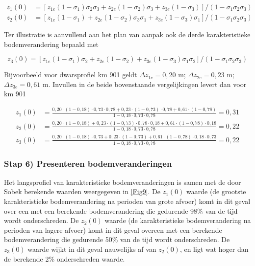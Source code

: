 \begin{align}
z_1(0) &= [z_{1e} (1-\sigma_1) \sigma_2 \sigma_3 + z_{2e} (1-\sigma_2) \sigma_3 + z_{3e} (1-\sigma_3)]/(1 - \sigma_1 \sigma_2 \sigma_3) \\
z_2(0) &= [z_{1e} (1-\sigma_1) + z_{2e} (1-\sigma_2) \sigma_3 \sigma_1 + z_{3e} (1-\sigma_3) \sigma_1]/(1 - \sigma_1 \sigma_2 \sigma_3)
\end{align}

Ter illustratie is aanvullend aan het plan van aanpak ook de derde karakteristieke bodemverandering bepaald met

\begin{equation}
z_3(0) = [z_{1e} (1-\sigma_1) \sigma_2 + z_{2e} (1-\sigma_2) + z_{3e} (1-\sigma_3) \sigma_1 \sigma_2]/(1 - \sigma_1 \sigma_2 \sigma_3)
\end{equation}

Bijvoorbeeld voor dwarsprofiel km 901 geldt $\Delta z_{1e}=0,20$ m; $\Delta z_{2e}=0,23$ m; $\Delta z_{3e}=0,61$ m.
Invullen in de beide bovenstaande vergelijkingen levert dan voor km 901

\begin{align}
z_1(0) &= \tfrac{0,20 \cdot (1-0,18) \cdot 0,73 \cdot 0,78 + 0,23 \cdot (1-0,73) \cdot 0,78 + 0,61 \cdot (1-0,78)}{1 - 0,18 \cdot 0,73 \cdot 0,78} = 0,31 \\
z_2(0) &= \tfrac{0,20 \cdot (1-0,18) + 0,23 \cdot (1-0,73) \cdot 0,78 \cdot 0,18 + 0,61 \cdot (1-0,78) \cdot 0,18}{1 - 0,18 \cdot 0,73 \cdot 0,78} = 0,22 \\
z_3(0) &= \tfrac{0,20 \cdot (1-0,18) \cdot 0,73 + 0,23 \cdot (1-0,73) + 0,61 \cdot (1-0,78) \cdot 0,18 \cdot 0,73}{1 - 0,18 \cdot 0,73 \cdot 0,78} = 0,22
\end{align}

\subsubsection*{Stap 6) Presenteren bodemveranderingen}

Het langsprofiel van karakteristieke bodemveranderingen is samen met de door Sobek berekende waarden weergegeven in \autoref{Fig9}.
De $z_1(0)$ waarde (de grootste karakteristieke bodemverandering na perioden van grote afvoer) komt in dit geval over een met een berekende bodemverandering die gedurende 98\% van de tijd wordt onderschreden.
De $z_2(0)$ waarde (de karakteristieke bodemverandering na perioden van lagere afvoer) komt in dit geval overeen met een berekende bodemverandering die gedurende 50\% van de tijd wordt onderschreden.
De $z_3(0)$ waarde wijkt in dit geval nauwelijks af van $z_2(0)$, en ligt wat hoger dan de berekende 2\% onderschreden waarde.

